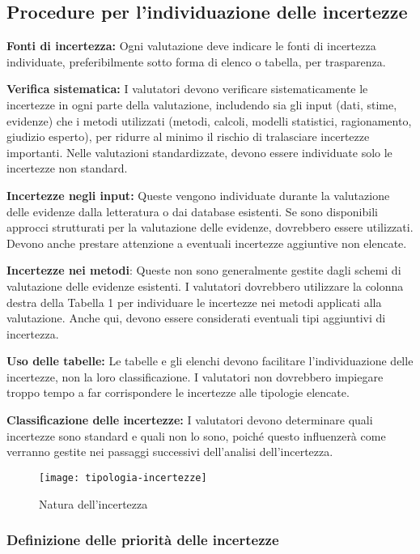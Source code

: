 \subsection{Procedure per l'individuazione delle incertezze} 

\indent\textbf{Fonti di incertezza:} Ogni valutazione deve indicare le fonti di incertezza individuate, preferibilmente sotto forma di elenco o tabella, per trasparenza.

\textbf{Verifica sistematica:} I valutatori devono verificare sistematicamente le incertezze in ogni parte della valutazione, includendo sia gli input (dati, stime, evidenze) che i metodi utilizzati (metodi, calcoli, modelli statistici, ragionamento, giudizio esperto), per ridurre al minimo il rischio di tralasciare incertezze importanti. Nelle valutazioni standardizzate, devono essere individuate solo le incertezze non standard.

\textbf{Incertezze negli input:} Queste vengono individuate durante la valutazione delle evidenze dalla letteratura o dai database esistenti. Se sono disponibili approcci strutturati per la valutazione delle evidenze, dovrebbero essere utilizzati. Devono anche prestare attenzione a eventuali incertezze aggiuntive non elencate.
 
\textbf{Incertezze nei metodi}: Queste non sono generalmente gestite dagli schemi di valutazione delle evidenze esistenti. I valutatori dovrebbero utilizzare la colonna destra della Tabella 1 per individuare le incertezze nei metodi applicati alla valutazione. Anche qui, devono essere considerati eventuali tipi aggiuntivi di incertezza.

\textbf{Uso delle tabelle:} Le tabelle e gli elenchi devono facilitare l'individuazione delle incertezze, non la loro classificazione. I valutatori non dovrebbero impiegare troppo tempo a far corrispondere le incertezze alle tipologie elencate.

\textbf{Classificazione delle incertezze:} I valutatori devono determinare quali incertezze sono standard e quali non lo sono, poiché questo influenzerà come verranno gestite nei passaggi successivi dell'analisi dell'incertezza.

\begin{figure}[!ht] 
    \centering 
    \texttt{[image: tipologia-incertezze]} 
    \caption{Natura dell'incertezza}
\end{figure}

\subsubsection{Definizione delle priorità delle incertezze}

